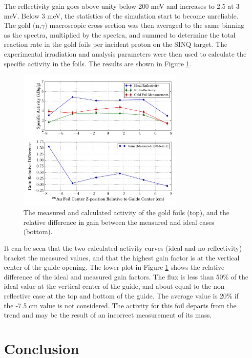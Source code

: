 \documentclass[a4paper,
              ]{jacow}
\begin{document}
The reflectivity gain goes above unity below 200 meV and increases to 2.5 at 3 meV.  Below 3 meV, the statistics of the simulation start to become unreliable.  The gold (n,$\gamma$) macroscopic cross section was then averaged to the same binning as the spectra, multiplied by the spectra, and summed to determine the total reaction rate in the gold foils per incident proton on the SINQ target.  The experimental irradiation and analysis parameters were then used to calculate the specific activity in the foils.  The results are shown in Figure \ref{activation}.

\begin{figure}[!htb]
   \centering
   \includegraphics*[trim = 0mm 5mm 0mm 5mm, width=83mm]{graphics/GF_act.pdf}
   \caption{The measured and calculated activity of the gold foils (top), and the relative difference in gain between the measured and ideal cases (bottom).}
   \label{activation}
\end{figure}

It can be seen that the two calculated activity curves (ideal and no reflectivity) bracket the measured values, and that the highest gain factor is at the vertical center of the guide opening.  The lower plot in Figure \ref{activation} shows the relative difference of the ideal and measured gain factors.  The flux is less than 50\% of the ideal value at the vertical center of the guide, and about equal to the non-reflective case at the top and bottom of the guide.  The average value is 20\% if the -7.5 cm value is not considered.  The activity for this foil departs from the trend and may be the result of an incorrect measurement of its mass.


\section{Conclusion}
\end{document}
